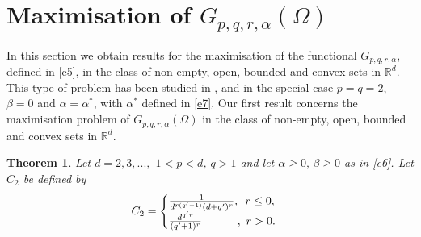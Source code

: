 \documentclass[a4paper,9pt]{article}
\newcommand{\R}{\mathbb{R}}
\newtheorem{theorem}{Theorem}
\begin{document}
\section{Maximisation of $G_{p,q,r,\alpha}(\Omega)$}\label{sec3}
In this section we obtain results for the  maximisation of the functional  $G_{p,q,r,\alpha}$, defined in \eqref{e5}, in the class of non-empty, open, bounded and convex sets in  $\R^d$.
This  type of problem has been studied in \cite{vdB1}, \cite{MB} and \cite{MM} in the special case
$p=q=2$,  $\beta=0$ and $\alpha=\alpha^*$, with $\alpha^*$ defined in \eqref{e7}.  Our first result concerns  the maximisation problem of  $G_{p,q,r,\alpha}(\Omega)$ in the class of non-empty, open, bounded and convex sets in $\R^d$.
\begin{theorem}\label{the_new1}
   Let $d=2,3,...,$ $1<p<d$, $q>1$ and let $\alpha\ge0,\,\beta \ge0$ as in \eqref{e6}. Let $C_2$ be defined by
\begin{equation}
\label{c_2}
C_2=\begin{cases}
\frac{1}{d^{r(q'-1)}(d+q')^r},\,\, \, r\le0,\\
\frac{d^{q'r}}{(q'+1)^r}\hspace{11mm},\,\, r>0.
\end{cases}
\end{equation}


\end{theorem}
\end{document}
